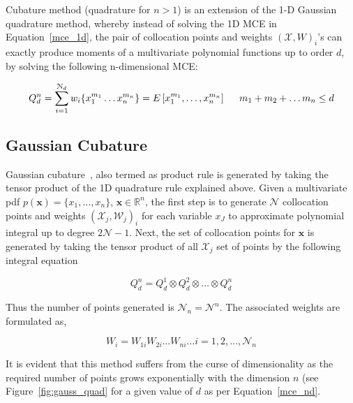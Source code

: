 Cubature method (quadrature for $n>1$) is an extension of the 1-D Gaussian quadrature method, whereby instead of solving the 1D MCE in Equation~\ref{mce_1d}, the pair of collocation points and weights $(\mathcal{X},W)_i$'s can exactly produce moments of a multivariate polynomial functions up to order $d$, by solving the following n-dimensional MCE:

\begin{equation}
\label{mce_nd}
Q_d^n = \sum_{i=1}^{\mathcal{N}_d} w_i \lbrace x_1^{m_1} \ldots x_n^{m_n} \rbrace = E \left[ x_1^{m_1},\ldots,x_n^{m_n}  \right]  \hspace{5mm} m_1 + m_2 + \ldots m_n \leq d
\end{equation}

\subsection{Gaussian Cubature}

Gaussian cubature~\cite{arasaratnam2009cubature}, also termed as product rule is generated by taking the tensor product of the 1D quadrature rule explained above. Given a multivariate pdf $p(\textbf{x}) = \lbrace x_1, \ldots, x_n \rbrace$, $\textbf{x} \in \mathbb{R}^n$, the first step is to generate $\mathcal{N}$ collocation points and weights $(\mathcal{X}_j,\mathcal{W}_j)_i$ for each variable $x_J$ to approximate polynomial integral up to degree $2\mathcal{N} - 1$. Next, the set of collocation points for $\textbf{x}$ is generated by taking the tensor product of all $\mathcal{X}_j$ set of points by the following integral equation

\begin{equation}
\label{eqn:gauss_quad}
Q_d^n = Q_d^1 \otimes Q_d^2 \otimes \ldots \otimes Q_d^n
\end{equation}

Thus the number of points generated is $\mathcal{N}_n = \mathcal{N}^n$. The associated weights are formulated as,

\begin{equation}
W_i = W_{1i}W_{2i} \ldots W_{ni} \ldots i = 1,2,\ldots,\mathcal{N}_n
\end{equation}

It is evident that this method suffers from the curse of dimensionality as the required number of points grows exponentially with the dimension $n$ (see Figure~\ref{fig:gauss_quad} for a given value of $d$ as per Equation~\ref{mce_nd}. 

